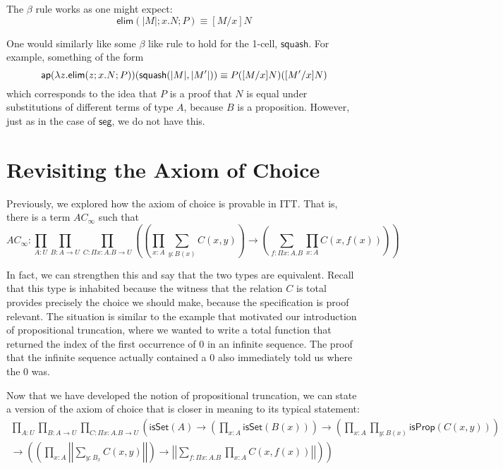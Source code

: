 \documentclass[11pt]{article}
\newcommand*{\ap}{\mathsf{ap}}
\newcommand*{\isSet}{\mathsf{isSet}}
\newcommand*{\isProp}{\mathsf{isProp}}
\newcommand*{\elimtrunc}{\mathsf{elim}}
\newcommand*{\squash}{\mathsf{squash}}
\begin{document}
The $\beta$ rule works as one might expect:
$$\elimtrunc(|M|; x.N; P)\equiv [M/x]N$$

One would similarly like some $\beta$ like rule to hold for the 1-cell, $\squash$. For
example, something of the form $$\ap(\lambda z. \elimtrunc(z; x. N;
P))(\squash(|M|, |M'|)) \jdeq P([M/x]N)([M'/x]N)$$ which corresponds to the
idea that $P$ is a proof that $N$ is equal under substitutions of different
terms of type $A$, because $B$ is a proposition. However, just as in the case of 
$\mathsf{seg}$, we do not have this.

\section{Revisiting the Axiom of Choice}

Previously, we explored how the axiom of choice is provable in ITT. That is, there is a term $AC_\infty$ such that
$$AC_\infty{:} \prod_{A{:}U} \prod_{B{:}A \to U} \prod_{C{:}\Pi x:A. B \to U}
\left(\left( \prod_{x{:}A} \sum_{y: B(x)} C(x,y) \right ) \to \left(\sum_{f: \Pi x{:} A. B} \prod_{x:A} C(x, f(x))\right)\right)
$$

In fact, we can strengthen this and say that the two types are equivalent.
Recall that this type is inhabited because the witness that the relation $C$ is
total provides precisely the choice we should make, because the specification
is proof relevant. The situation is similar to the example that motivated our
introduction of propositional truncation, where we wanted to write a total
function that returned the index of the first occurrence of 0 in an infinite
sequence. The proof that the infinite sequence actually contained a 0 also
immediately told us where the 0 was.

Now that we have developed the notion of propositional truncation, we can state
a version of the axiom of choice that is closer in meaning to its typical
statement:
\begin{multline*}
\prod_{A{:}U} \prod_{B{:}A \to U} \prod_{C{:}\Pi x:A. B \to U}
\left(\isSet(A) \to \left(\prod_{x:A} \isSet(B(x))\right) \to \left(\prod_{x:A} \prod_{y: B(x)} \isProp(C(x,y))\right) \right. \\
\left. \to \left(\left( \prod_{x{:}A} \left|\left|\sum_{y: B_x} C(x,y) \right|\right| \right ) \to 
  \left|\left| \sum_{f: \Pi x{:} A. B} \prod_{x:A} C(x, f(x)) \right|\right| \right)\right)
\end{multline*}

\end{document}
